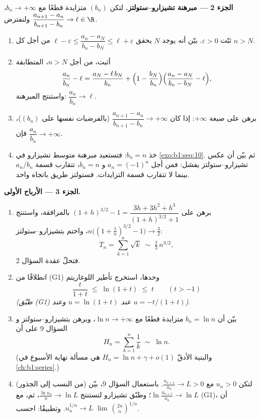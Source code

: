 \begin{problem}[{مسألة نهاية الأسبوع --- مبرهنة تشيزارو--ستولتز
والمقاربة $u_n \sim \sqrt{3/n}$ من أجل $u_{n+1} = \sin
u_n$}]
\medskip
\noindent\textbf{الجزء 2 --- مبرهنة تشيزارو--ستولتز.} لتكن
$(b_n)$ متزايدة قطعًا مع $b_n \to +\infty$،
ولنفترض $\dfrac{a_{n+1} - a_n}{b_{n+1} - b_n} \to \ell \in \R$.
\begin{enumerate}[resume]
  \item ثبّت $\varepsilon > 0$. بيّن أنه يوجد $N$ يحقق
        $\ell - \varepsilon \leq \dfrac{a_n - a_N}{b_n - b_N}
        \leq \ell + \varepsilon$ من أجل كل $n > N$.
  \item أثبت، من أجل $n > N$، المتطابقة
        \[
        \frac{a_n}{b_n} - \ell
        = \frac{a_N - \ell\,b_N}{b_n}
        + \Bigl(1 - \frac{b_N}{b_n}\Bigr)
        \Bigl(\frac{a_n - a_N}{b_n - b_N} - \ell\Bigr),
        \]
        واستنتج المبرهنة: $\dfrac{a_n}{b_n} \to \ell$.
  \item برهن على صيغة $+\infty$: إذا كان $\dfrac{a_{n+1} -
        a_n}{b_{n+1} - b_n} \to +\infty$ (بالفرضيات نفسها على
        $(b_n)$)، فإن $\dfrac{a_n}{b_n} \to +\infty$.
  \item خذ $b_n = n$: فتستعيد مبرهنة متوسط تشيزارو في
        \cref{exo:b1:seq:10}. ثم بيّن أن عكس
        تشيزارو--ستولتز يفشل: فمن أجل $a_n = (-1)^n$ و $b_n = n$، تتقارب
        قسمة $a_n/b_n$ بينما لا تتقارب قسمة
        التزايدات. فستولتز طريق باتجاه واحد.
\end{enumerate}

\medskip
\noindent\textbf{الجزء 3 --- الأرباح الأولى.}
\begin{enumerate}[resume]
  \item برهن على $(1+h)^{3/2} - 1 = \dfrac{3h + 3h^2 +
        h^3}{(1+h)^{3/2} + 1}$ بالمرافقة، واستنتج
        $n\bigl((1 + \tfrac1n)^{3/2} - 1\bigr) \to \tfrac32$،
        واختم بتشيزارو--ستولتز:
        \[
        T_n = \sum_{k=1}^{n} \sqrt k \;\sim\; \tfrac23\,
        n^{3/2} ,
        \]
        فتحلّ عقدة السؤال 2.
  \item انطلاقًا من (G1) وحدها، استخرج تأطير اللوغاريتم
        \[
        \frac{t}{1 + t} \;\leq\; \ln(1 + t) \;\leq\; t
        \qquad (t > -1)
        \]
        \emph{(طبّق (G1) عند $u = \ln(1+t)$ وعند $u =
        -t/(1+t)$)}.
  \item بيّن أن $b_n = \ln n$ متزايدة قطعًا مع
        $\ln n \to +\infty$، وبرهن بتشيزارو--ستولتز و
        السؤال 9 على أن
        \[
        H_n = \sum_{k=1}^{n} \frac 1k \;\sim\; \ln n .
        \]
        (والبنية الأدقّ $H_n = \ln n + \gamma + o(1)$ هي
        مسألة نهاية الأسبوع في \cref{ch:b1:series}.)
  \item (من النسب إلى الجذور) لتكن $u_n > 0$ مع
        $\frac{u_{n+1}}{u_n} \to L > 0$. باستعمال السؤال 9، بيّن
        $\ln\frac{u_{n+1}}{u_n} \to \ln L$؛ وطبّق تشيزارو
        لتستنتج $\frac{\ln u_n}{n} \to \ln L$، ثم، مع (G1)،
        أن $u_n^{1/n} \to L$. وتطبيقًا: احسب
        $\lim\,\binom{2n}{n}^{1/n}$.
\end{enumerate}


\end{problem}
